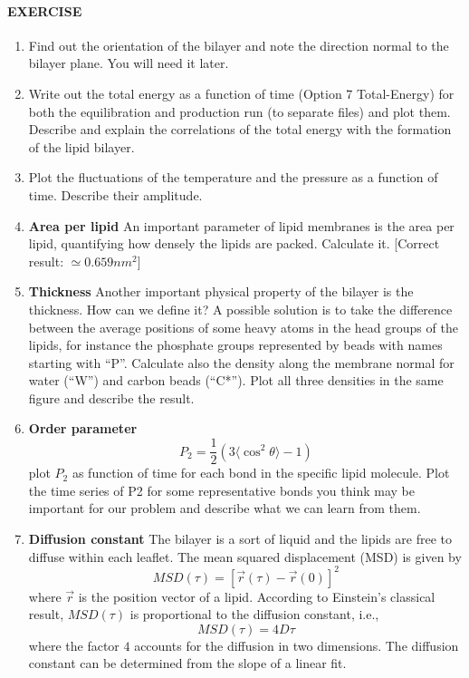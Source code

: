 \begin{exercisebox}
\paragraph{EXERCISE}
\begin{enumerate}
  \item Find out the orientation of the bilayer and note the direction normal to the bilayer plane. You will need it later.
  \item Write out the total energy as a function of time (Option 7 Total-Energy) for both the equilibration and production run (to separate files) and plot them. Describe and explain the correlations of the total energy with the formation of the lipid bilayer.
  \item Plot the fluctuations of the temperature and the pressure as a function of time. Describe their amplitude.
   \item \textbf{Area per lipid} An important parameter of lipid membranes is the area per lipid, quantifying how densely the lipids are packed. Calculate it. [Correct result: $\simeq 0.659 nm^2$]
  \item \textbf{Thickness} Another important physical property of the bilayer is the thickness. How can we define it? A possible solution is to take the difference between the average positions of some heavy atoms in the head groups of the lipids, for instance the phosphate groups represented by beads with names starting with “P”.
  Calculate also the density along the membrane normal for water (“W”) and carbon beads (“C*”). Plot all three densities in the same figure and describe the result.
  \item \textbf{Order parameter} 
  $$
  P_2 = \frac{1}{2}\left(3\langle\cos^2{\theta}\rangle - 1\right)
  $$
  plot $P_2$ as function of time for each bond in the specific lipid molecule. Plot the time series of P2 for some representative bonds you think may be important for our problem and describe what we can learn from them.
  \item \textbf{Diffusion constant} The bilayer is a sort of liquid and the lipids are free to diffuse within each leaflet. The mean squared displacement (MSD) is given by
        $$
        MSD(\tau) = [ \vec{r}(\tau) - \vec{r}(0)]^2
        $$
        where $\vec{r}$ is the position vector of a lipid. According to Einstein’s classical
        result,  $MSD(\tau)$ is proportional to the diffusion constant, i.e.,
        $$
        MSD(\tau) = 4D\tau
        $$
        where the factor $4$ accounts for the diffusion in two dimensions. The diffusion constant can be determined from the slope of a linear fit.
\end{enumerate}
\end{exercisebox}

